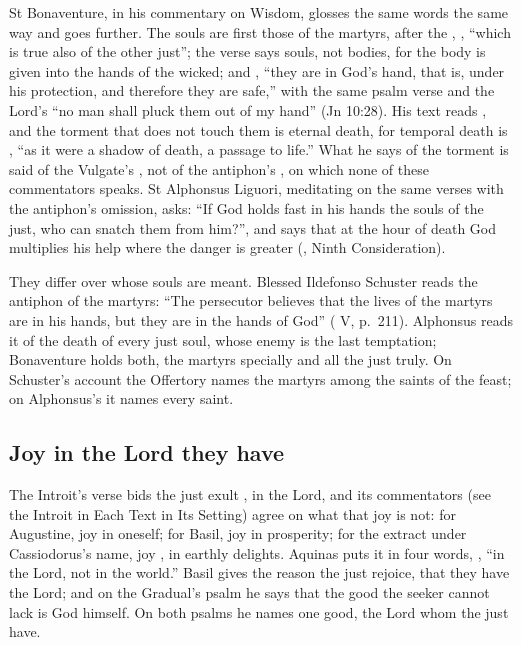 St Bonaventure, in his commentary on Wisdom, glosses the same words the same
way and goes further. The souls are first those of the martyrs, after the
, , ``which is true
also of the other just''; the verse says souls, not bodies, for the body is
given into the hands of the wicked; and , ``they are in God's hand, that is, under his
protection, and therefore they are safe,'' with the same psalm verse and the Lord's
``no man shall pluck them out of my hand'' (Jn 10:28). His text reads
, and the torment that does not touch them is eternal
death, for temporal death is , ``as it were a shadow of death, a passage to life.'' What he says
of the torment is said of the Vulgate's , not of the antiphon's
, on which none of these commentators speaks. St
Alphonsus Liguori, meditating on the same verses with the antiphon's omission,
asks: ``If God holds fast in his hands the souls of the just, who can snatch
them from him?'', and says that at the hour of death God multiplies his help
where the danger is greater (, Ninth
Consideration).

They differ over whose souls are meant. Blessed Ildefonso Schuster reads the
antiphon of the martyrs: ``The persecutor believes that the lives of the
martyrs are in his hands, but they are in the hands of God'' ( V, p.~211). Alphonsus reads it of the death of every just soul,
whose enemy is the last temptation; Bonaventure holds both, the martyrs
specially and all the just truly. On Schuster's account the Offertory names
the martyrs among the saints of the feast; on Alphonsus's it names every
saint.

\subsection{Joy in the Lord they have}
\label{sec:no-want-elements}

The Introit's verse bids the just exult , in the Lord, and its
commentators (see the Introit in Each Text in Its Setting) agree on what that
joy is not: for Augustine, joy in oneself; for Basil, joy in prosperity; for
the extract under Cassiodorus's name, joy ,
in earthly delights. Aquinas puts it in four words, , ``in the Lord, not in the world.'' Basil gives the reason the just
rejoice, that they have the Lord; and on the Gradual's psalm he says that the
good the seeker cannot lack is God himself. On both psalms he names one good,
the Lord whom the just have.

